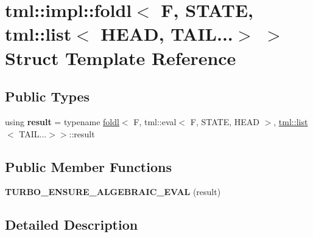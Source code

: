 \hypertarget{structtml_1_1impl_1_1foldl_3_01_f_00_01_s_t_a_t_e_00_01tml_1_1list_3_01_h_e_a_d_00_01_t_a_i_l_8_8_8_4_01_4}{\section{tml\+:\+:impl\+:\+:foldl$<$ F, S\+T\+A\+T\+E, tml\+:\+:list$<$ H\+E\+A\+D, T\+A\+I\+L...$>$ $>$ Struct Template Reference}
\label{structtml_1_1impl_1_1foldl_3_01_f_00_01_s_t_a_t_e_00_01tml_1_1list_3_01_h_e_a_d_00_01_t_a_i_l_8_8_8_4_01_4}
}
\subsection*{Public Types}
\begin{DoxyCompactItemize}
\item 
\hypertarget{structtml_1_1impl_1_1foldl_3_01_f_00_01_s_t_a_t_e_00_01tml_1_1list_3_01_h_e_a_d_00_01_t_a_i_l_8_8_8_4_01_4_a4fb36ab3885d85ea1f325f9456797378}{using {\bfseries result} = typename \hyperlink{structtml_1_1impl_1_1foldl}{foldl}$<$ F, tml\+::eval$<$ F, S\+T\+A\+T\+E, H\+E\+A\+D $>$, \hyperlink{structtml_1_1list}{tml\+::list}$<$ T\+A\+I\+L...$>$$>$\+::result}\label{structtml_1_1impl_1_1foldl_3_01_f_00_01_s_t_a_t_e_00_01tml_1_1list_3_01_h_e_a_d_00_01_t_a_i_l_8_8_8_4_01_4_a4fb36ab3885d85ea1f325f9456797378}

\end{DoxyCompactItemize}
\subsection*{Public Member Functions}
\begin{DoxyCompactItemize}
\item 
\hypertarget{structtml_1_1impl_1_1foldl_3_01_f_00_01_s_t_a_t_e_00_01tml_1_1list_3_01_h_e_a_d_00_01_t_a_i_l_8_8_8_4_01_4_a038e0ce69bcb71d4c406052bde29d944}{{\bfseries T\+U\+R\+B\+O\+\_\+\+E\+N\+S\+U\+R\+E\+\_\+\+A\+L\+G\+E\+B\+R\+A\+I\+C\+\_\+\+E\+V\+A\+L} (result)}\label{structtml_1_1impl_1_1foldl_3_01_f_00_01_s_t_a_t_e_00_01tml_1_1list_3_01_h_e_a_d_00_01_t_a_i_l_8_8_8_4_01_4_a038e0ce69bcb71d4c406052bde29d944}

\end{DoxyCompactItemize}


\subsection{Detailed Description}
